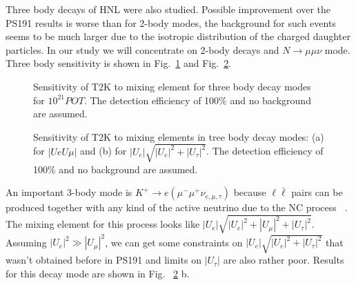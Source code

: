 \documentclass[../main.tex]{subfiles}
\begin{document}
Three body decays of HNL were also studied. Possible improvement over the PS191 results is worse than for 2-body modes, the background for such events seems to be much larger due to the isotropic distribution of the charged daughter particles. In our study we will concentrate on 2-body decays and $N\to\mu\mu\nu$ mode. Three body sensitivity is shown in Fig.~\ref{fig:HNL:TreeBodyFirst} and Fig.~\ref{fig:HNL:ThreeBodySecond}.

\begin{figure}[!ht]
    \begin{minipage}[!ht]{0.49\linewidth}
    \end{minipage}
    \hfill
    \begin{minipage}[!ht]{0.49\linewidth}
    \end{minipage}
    \caption{Sensitivity of T2K to mixing element for three body decay modes for $10^{21}POT$. The detection efficiency of 100\% and no background are assumed.}
    \label{fig:HNL:TreeBodyFirst}
\end{figure}

\begin{figure}[!ht]
    \begin{minipage}[!ht]{0.49\linewidth}
    \end{minipage}
    \hfill
    \begin{minipage}[!ht]{0.49\linewidth}
    \end{minipage}
    \caption{Sensitivity of T2K to mixing elements in tree body decay modes: (a) for $\left|UeU\mu\right|$ and (b) for $\left|U_{e}\right|\sqrt{\left|U_{e}\right|^2+\left|U_{\tau}\right|^2}$. The detection efficiency of 100\% and no background are assumed.}
    \label{fig:HNL:ThreeBodySecond}
\end{figure}

An important 3-body mode is $K^+\rightarrow e(\mu^-\mu^+\nu_{e,\mu,\tau})$ because $\ell\bar{\ell}$ pairs can be produced together with any kind of the active neutrino due to  the NC process ~\cite{Johnson1997}. The mixing element for this process looks like $\left|U_{e}\right|\sqrt{\left|U_{e}\right|^2+\left|U_{\mu}\right|^2+\left|U_{\tau}\right|^2}$. Assuming $\left|U_e\right|^2 \gg\left|U_{\mu}\right|^2$, we can get some constraints on $\left|U_{e}\right|\sqrt{\left|U_{e}\right|^2+\left|U_{\tau}\right|^2}$ that wasn't obtained before in PS191 and limits on $\left|U_{\tau}\right|$ are also rather poor. Results for this decay mode are shown in Fig. ~\ref{fig:HNL:ThreeBodySecond} b.
\end{document}
